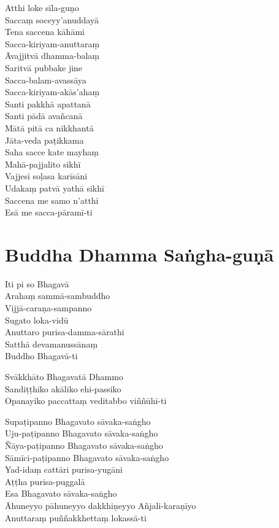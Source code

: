 \begin{paritta}
Atthi loke sīla-guṇo\\
Saccaṃ soceyy'anuddayā\\
Tena saccena kāhāmi\\
Sacca-kiriyam-anuttaraṃ\\
Āvajjitvā dhamma-balaṃ\\
Saritvā pubbake jine\\
Sacca-balam-avassāya\\
Sacca-kiriyam-akās'ahaṃ\\
Santi pakkhā apattanā\\
Santi pādā avañcanā\\
Mātā pitā ca nikkhantā\\
Jāta-veda paṭikkama\\
Saha sacce kate mayhaṃ\\
Mahā-pajjalito sikhī\\
Vajjesi soḷasa karīsāni\\
Udakaṃ patvā yathā sikhī\\
Saccena me samo n'atthi\\
Esā me sacca-pāramī-ti

\end{paritta}

\chapter{Buddha Dhamma Saṅgha-guṇā}%


\begin{paritta}
Iti pi so Bhagavā\\
Arahaṃ sammā-sambuddho\\
Vijjā-caraṇa-sampanno\\
Sugato loka-vidū\\
Anuttaro purisa-damma-sārathi\\
Satthā devamanussānaṃ\\
Buddho Bhagavā-ti

Svākkhāto Bhagavatā Dhammo\\
Sandiṭṭhiko akāliko ehi-passiko\\
Opanayiko paccattaṃ veditabbo viññūhī-ti

Supaṭipanno Bhagavato sāvaka-saṅgho\\
Uju-paṭipanno Bhagavato sāvaka-saṅgho\\
Ñāya-paṭipanno Bhagavato sāvaka-saṅgho\\
Sāmīci-paṭipanno Bhagavato sāvaka-saṅgho\\
Yad-idaṃ cattāri purisa-yugāni\\
Aṭṭha purisa-puggalā\\
Esa Bhagavato sāvaka-saṅgho\\
Āhuneyyo pāhuneyyo dakkhiṇeyyo Añjali-karaṇīyo\\
Anuttaraṃ puññakkhettaṃ lokassā-ti
\end{paritta}

